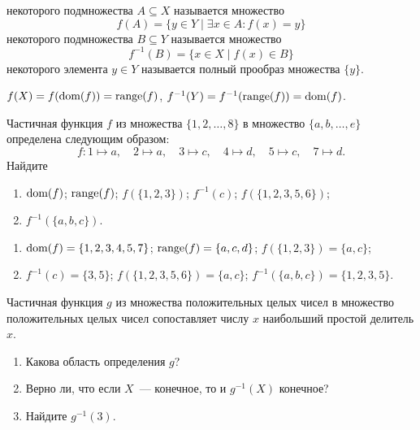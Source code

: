 \begin{definition}
     некоторого подмножества $ A \subseteq X $ называется множество
    \[
        f(A) = \{ y \in Y \mid \exists x \in A: f(x) = y \}
    \]
     некоторого подмножества $ B \subseteq Y $ называется множество
    \[
        f^{-1}(B) = %
        \{ x \in X \mid f(x) \in B \}
    \]
     некоторого элемента $ y \in Y $ называется полный прообраз множества $ \{ y \} $.
\end{definition}

\begin{remark}
    $ f(X) = f(\operatorname*{\textnormal{dom}}(f)) = \operatorname*{\textnormal{range}}(f) $, $ f^{-1}(Y) = f^{-1}(\operatorname*{\textnormal{range}}(f)) = \operatorname*{\textnormal{dom}}(f) $.
\end{remark}


\begin{Exercise}[counter=SecExercise, label={exercise:functions:sets_examples}]
    \noindent
    Частичная функция $ f $ из множества $ \{1, 2, \ldots, 8 \} $ в множество $ \{a, b, \ldots, e \} $ определена следующим образом:
    \[
        f: 1 \mapsto a, \quad 2 \mapsto a, \quad 3 \mapsto c, \quad 4 \mapsto d, \quad 5 \mapsto c, \quad 7 \mapsto d.
    \]
    Найдите
    \begin{enumerate}[label=\textbf{\alph*)}]
        \item $ \operatorname*{\textnormal{dom}}(f) $;
        \inlineitem $ \operatorname*{\textnormal{range}}(f) $;
        \inlineitem $ f(\{1, 2, 3\}) $;
        \inlineitem $ f^{-1}(c) $;
        \inlineitem $ f(\{1, 2, 3, 5, 6\}) $;
        \item $ f^{-1}(\{a, b, c\}) $.
    \end{enumerate}
\end{Exercise}

\begin{Answer}
    \noindent
    \begin{enumerate}[label=\textbf{\alph*)}]
        \item $ \operatorname*{\textnormal{dom}}(f) = \{1, 2, 3, 4, 5, 7\} $;
        \inlineitem $ \operatorname*{\textnormal{range}}(f) = \{a, c, d\} $;
        \inlineitem $ f(\{1, 2, 3\}) = \{a, c\} $;
        \item $ f^{-1}(c) = \{3, 5\} $;
        \inlineitem $ f(\{1, 2, 3, 5, 6\}) = \{a, c\} $;
        \inlineitem $ f^{-1}(\{a, b, c\}) = \{1, 2, 3, 5\} $.
    \end{enumerate}
\end{Answer}


\begin{Exercise}[counter=SecExercise, label={exercise:functions:max_prime_devisor}]
    \noindent
    Частичная функция $ g $ из множества положительных целых чисел в множество положительных целых чисел
    сопоставляет числу $ x $ наибольший простой делитель $ x $.
    \begin{enumerate}[label=\textbf{\alph*)}]
        \item Какова область определения $ g $?
        \item Верно ли, что если $ X $~--- конечное, то и $ g^{-1}(X) $ конечное?
        \item Найдите $ g^{-1}(3) $.
    \end{enumerate}
\end{Exercise}

